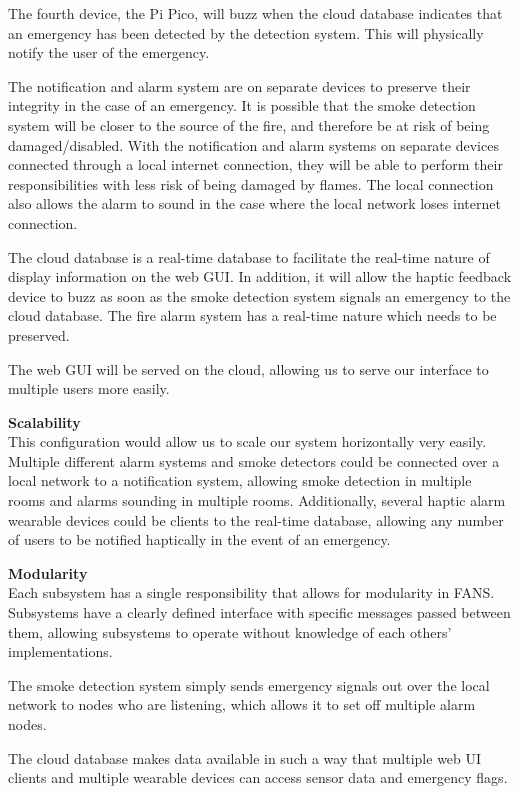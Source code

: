 The fourth device, the Pi Pico, will buzz when the cloud database indicates that an emergency has been detected by the
detection system. This will physically notify the user of the emergency.

The notification and alarm system are on separate devices to preserve their integrity in the case of an emergency. It
is possible that the smoke detection system will be closer to the source of the fire, and therefore be at risk of being
damaged/disabled. With the notification and alarm systems on separate devices connected through a local internet
connection, they will be able to perform their responsibilities with less risk of being damaged by flames. The local
connection also allows the alarm to sound in the case where the local network loses internet connection.

The cloud database is a real-time database to facilitate the real-time nature of display information on the web GUI. In
addition, it will allow the haptic feedback device to buzz as soon as the smoke detection system signals an emergency
to the cloud database. The fire alarm system has a real-time nature which needs to be preserved.

The web GUI will be served on the cloud, allowing us to serve our interface to multiple users more easily.

\textbf{Scalability} \\
This configuration would allow us to scale our system horizontally very easily. Multiple different alarm systems and
smoke detectors could be connected over a local network to a notification system, allowing smoke detection in multiple
rooms and alarms sounding in multiple rooms. Additionally, several haptic alarm wearable devices could be clients to
the real-time database, allowing any number of users to be notified haptically in the event of an emergency.

\textbf{Modularity} \\
Each subsystem has a single responsibility that allows for modularity in FANS. Subsystems have a clearly defined
interface with specific messages passed between them, allowing subsystems to operate without knowledge of each others’
implementations.

The smoke detection system simply sends emergency signals out over the local network to nodes who are listening, which
allows it to set off multiple alarm nodes.

The cloud database makes data available in such a way that multiple web UI clients and multiple wearable devices can
access sensor data and emergency flags.

